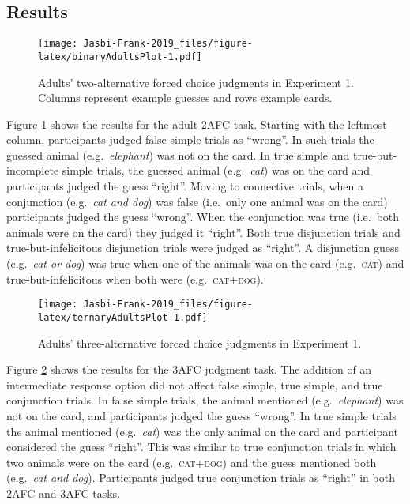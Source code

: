 \documentclass[
  english,
  ,man,floatsintext]{apa6}
\begin{document}
\hypertarget{results}{%
\subsection{Results}\label{results}}

\begin{figure}
\centering
\texttt{[image: Jasbi-Frank-2019\_files/figure-latex/binaryAdultsPlot-1.pdf]}
\caption{\label{fig:binaryAdultsPlot}Adults' two-alternative forced choice judgments in Experiment 1. Columns represent example guesses and rows example cards.}
\end{figure}

Figure \ref{fig:binaryAdultsPlot} shows the results for the adult 2AFC task. Starting with the leftmost column, participants judged false simple trials as \enquote{wrong}. In such trials the guessed animal (e.g.~\emph{elephant}) was not on the card. In true simple and true-but-incomplete simple trials, the guessed animal (e.g.~\emph{cat}) was on the card and participants judged the guess \enquote{right}. Moving to connective trials, when a conjunction (e.g.~\emph{cat and dog}) was false (i.e.~only one animal was on the card) participants judged the guess \enquote{wrong}. When the conjunction was true (i.e.~both animals were on the card) they judged it \enquote{right}. Both true disjunction trials and true-but-infelicitous disjunction trials were judged as \enquote{right}. A disjunction guess (e.g.~\emph{cat or dog}) was true when one of the animals was on the card (e.g.~\textsc{cat}) and true-but-infelicitous when both were (e.g.~\textsc{cat+dog}).

\begin{figure}
\centering
\texttt{[image: Jasbi-Frank-2019\_files/figure-latex/ternaryAdultsPlot-1.pdf]}
\caption{\label{fig:ternaryAdultsPlot}Adults' three-alternative forced choice judgments in Experiment 1.}
\end{figure}

Figure \ref{fig:ternaryAdultsPlot} shows the results for the 3AFC judgment task. The addition of an intermediate response option did not affect false simple, true simple, and true conjunction trials. In false simple trials, the animal mentioned (e.g.~\emph{elephant}) was not on the card, and participants judged the guess \enquote{wrong}. In true simple trials the animal mentioned (e.g.~\emph{cat}) was the only animal on the card and participant considered the guess \enquote{right}. This was similar to true conjunction trials in which two animals were on the card (e.g.~\textsc{cat+dog}) and the guess mentioned both (e.g.~\emph{cat and dog}). Participants judged true conjunction trials as \enquote{right} in both 2AFC and 3AFC tasks.
\end{document}
